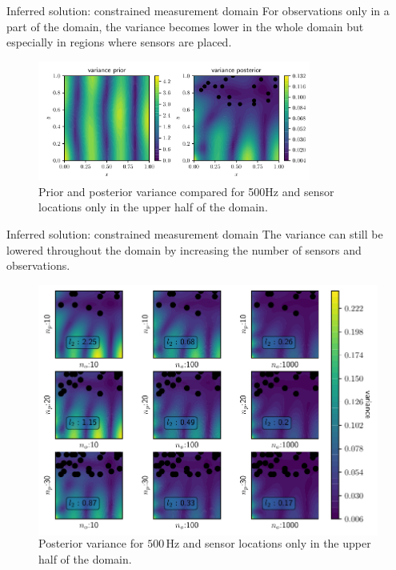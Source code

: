 \documentclass[fleqn,11pt,aspectratio=43]{beamer}
\begin{document}
\begin{frame}{Inferred solution: constrained measurement domain}
For observations only in a part of the domain, the variance becomes lower in the whole domain but especially in regions where sensors are placed.
\begin{figure}[!ht]
\includegraphics[width=0.8\textwidth]{../../Python/Results/2D/HalfSide/3/HalfSide.pdf}
\centering
\caption{Prior and posterior variance compared for 500Hz and sensor locations only in the upper half of the domain. }
\label{fig:VarianceHalfSided2D}
\end{figure}
\end{frame}




\begin{frame}{Inferred solution: constrained measurement domain}
The variance can still be lowered throughout the domain by increasing the number of sensors and observations.
\begin{figure}
\begin{columns}
\includegraphics[width=1\textwidth]{../../Python/Results/2D/HalfSide/4/VarField_Posterior.pdf}
\caption{Posterior variance for $500 \,\mathrm{Hz}$ and sensor locations only in the upper half of the domain. }
\end{columns}
\end{figure}

\end{frame}
\end{document}
